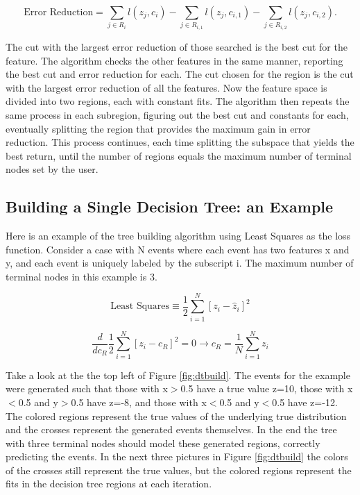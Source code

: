 \documentclass[12pt]{article}
\begin{document}
\begin{equation}
\textrm{Error Reduction} = \sum_{j \in R_{i}} l(z_j,c_i) - \sum_{j \in R_{i,1}} l(z_j,c_{i,1}) - \sum_{j \in R_{i,2}} l(z_j,c_{i,2}).
\end{equation}

The cut with the largest error reduction of those searched is the best cut for the feature. The algorithm checks the other features in the same manner, reporting the best cut and error reduction for each. The cut chosen for the region is the cut with the largest error reduction of all the features. Now the feature space is divided into two regions, each with constant fits. The algorithm then repeats the same process in each subregion, figuring out the best cut and constants for each, eventually splitting the region that provides the maximum gain in error reduction. This process continues, each time splitting the subspace that yields the best return, until the number of regions equals the maximum number of terminal nodes set by the user. 

\subsection{Building a Single Decision Tree: an Example}

Here is an example of the tree building algorithm using Least Squares as the loss function. Consider a case with N events where each event has two features x and y, and each event is uniquely labeled by the subscript i. The maximum number of terminal nodes in this example is 3.

\begin{equation}
\textrm{Least Squares} \equiv \frac{1}{2}\sum_{i=1}^{N} [z_i-\hat{z}_i]^2
\end{equation}

\begin{equation}
\frac{d}{dc_R}\frac{1}{2}\sum_{i=1}^{N} [z_i-c_R]^2 = 0 \rightarrow c_R = \frac{1}{N}\sum_{i=1}^{N}z_i
\end{equation}

Take a look at the the top left of Figure \ref{fig:dtbuild}. The events for the example were generated such that those with x$>$0.5 have a true value z=10, those with x$<$0.5 and y$>$0.5 have z=-8, and those with x$<$0.5 and y$<$0.5 have z=-12. The colored regions represent the true values of the underlying true distribution and the crosses represent the generated events themselves. In the end the tree with three terminal nodes should model these generated regions, correctly predicting the events. In the next three pictures in Figure \ref{fig:dtbuild} the colors of the crosses still represent the true values, but the colored regions represent the fits in the decision tree regions at each iteration.
\end{document}
